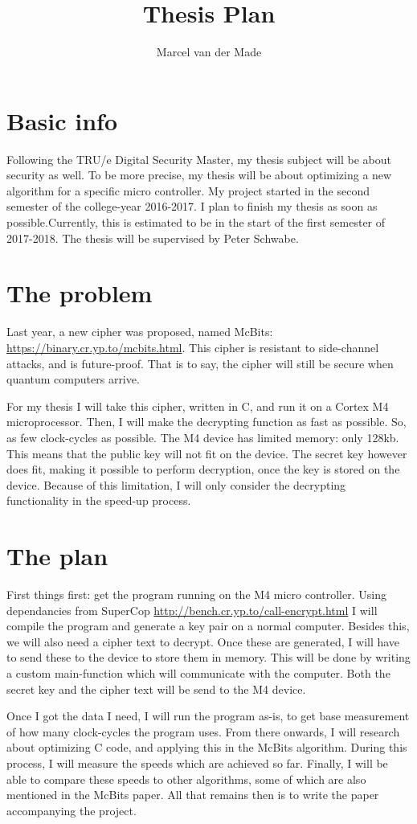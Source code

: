 \documentclass[a4paper]{article}
\title{Thesis Plan}
\author{Marcel van der Made}
\begin{document}
\maketitle

\section*{Basic info}
Following the TRU/e Digital Security Master, my thesis subject will be about security as well. To be more precise, my thesis will be about optimizing a new algorithm for a specific micro controller. My project started in the second semester of the college-year 2016-2017. I plan to finish my thesis as soon as possible.Currently, this is estimated to be in the start of the first semester of 2017-2018. The thesis will be supervised by Peter Schwabe.

\section*{The problem}
Last year, a new cipher was proposed, named McBits: \url{https://binary.cr.yp.to/mcbits.html}. This cipher is resistant to side-channel attacks, and is future-proof. That is to say, the cipher will still be secure when quantum computers arrive.

For my thesis I will take this cipher, written in C, and run it on a Cortex M4 microprocessor. Then, I will make the decrypting function as fast as possible. So, as few clock-cycles as possible. The M4 device has limited memory: only 128kb. This means that the public key will not fit on the device. The secret key however does fit, making it possible to perform decryption, once the key is stored on the device. Because of this limitation, I will only consider the decrypting functionality in the speed-up process.

\section*{The plan}
First things first: get the program running on the M4 micro controller. Using dependancies from SuperCop \url{http://bench.cr.yp.to/call-encrypt.html} I will compile the program and generate a key pair on a normal computer. Besides this, we will also need a cipher text to decrypt. Once these are generated, I will have to send these to the device to store them in memory. This will be done by writing a custom main-function which will communicate with the computer. Both the secret key and the cipher text will be send to the M4 device.

Once I got the data I need, I will run the program as-is, to get base measurement of how many clock-cycles the program uses. From there onwards, I will research about optimizing C code, and applying this in the McBits algorithm. During this process, I will measure the speeds which are achieved so far. Finally, I will be able to compare these speeds to other algorithms, some of which are also mentioned in the McBits paper. All that remains then is to write the paper accompanying the project.
\end{document}
